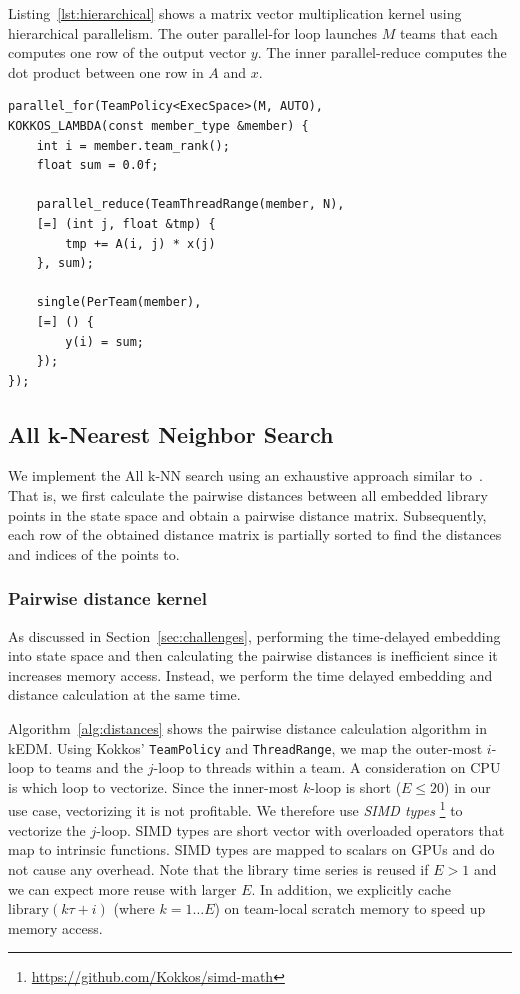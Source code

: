 \documentclass[conference]{IEEEtran}
\begin{document}
Listing~\ref{lst:hierarchical} shows a matrix vector multiplication kernel
using hierarchical parallelism. The outer parallel-for loop launches $M$ teams
that each computes one row of the output vector $y$. The inner parallel-reduce
computes the dot product between one row in $A$ and $x$.

\begin{lstlisting}[caption={Hierarchical data parallel loop},label={lst:hierarchical}]
parallel_for(TeamPolicy<ExecSpace>(M, AUTO),
KOKKOS_LAMBDA(const member_type &member) {
    int i = member.team_rank();
    float sum = 0.0f;

    parallel_reduce(TeamThreadRange(member, N),
    [=] (int j, float &tmp) {
        tmp += A(i, j) * x(j)
    }, sum);

    single(PerTeam(member),
    [=] () {
        y(i) = sum;
    });
});
\end{lstlisting}

\subsection{All k-Nearest Neighbor Search}

We implement the All k-NN search using an exhaustive approach similar
to~\cite{Garcia2008,Garcia2010}. That is, we first calculate the pairwise
distances between all embedded library points in the state space and obtain a
pairwise distance matrix. Subsequently, each row of the obtained distance
matrix is partially sorted to find the distances and indices of the points to.


\subsubsection{Pairwise distance kernel}
As discussed in Section~\ref{sec:challenges}, performing the time-delayed
embedding into state space and then calculating the pairwise distances is
inefficient since it increases memory access. Instead, we perform the time
delayed embedding and distance calculation at the same time.

Algorithm~\ref{alg:distances} shows the pairwise distance calculation
algorithm in kEDM\@. Using Kokkos' \texttt{TeamPolicy} and
\texttt{ThreadRange}, we map the outer-most $i$-loop to teams and the $j$-loop to
threads within a team. A consideration on CPU is which loop to vectorize.
Since the inner-most $k$-loop is short ($E \leq 20$) in our use case,
vectorizing it is not profitable. We therefore use \textit{SIMD types}
\footnote{\url{https://github.com/Kokkos/simd-math}} to vectorize the
$j$-loop. SIMD types are short vector with overloaded operators that map to
intrinsic functions. SIMD types are mapped to scalars on GPUs and do not cause
any overhead.
Note that the library time series is reused if $E > 1$ and we can expect
more reuse with larger $E$. In addition, we explicitly cache $\mathrm{library}
(k \tau + i)$ (where $k=1 \dots E$) on team-local scratch memory to speed up
memory access.
\end{document}
